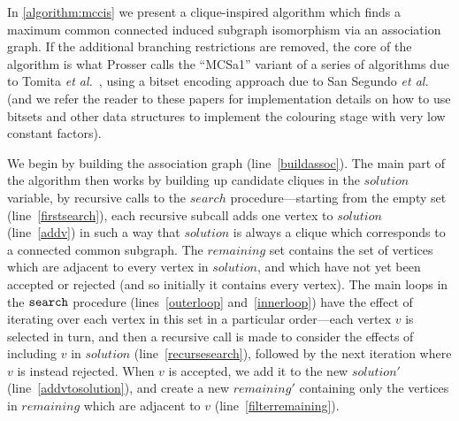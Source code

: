 \documentclass{llncs}
\newcommand{\lineref}[1]{line~\ref{#1}}
\newcommand{\twolinesref}[2]{lines~\ref{#1} and~\ref{#2}}
\begin{document}
In \cref{algorithm:mccis} we present a clique-inspired algorithm which finds a maximum common
connected induced subgraph isomorphism via an
association graph. If the additional
branching restrictions are removed, the core of the algorithm is what Prosser
\cite{DBLP:journals/algorithms/Prosser12} calls the ``MCSa1'' variant of a series of algorithms due
to Tomita \textit{et al.}\
\cite{DBLP:conf/dmtcs/TomitaS03,DBLP:journals/jgo/TomitaK07,DBLP:conf/walcom/TomitaSHTW10}, using a
bitset encoding approach due to San Segundo \textit{et al.}\
\cite{DBLP:journals/cor/SegundoRJ11,DBLP:journals/ol/SegundoMRH13} (and we refer the reader to these
papers for implementation details on how to use bitsets and other data structures to implement the
colouring stage with very low constant factors).

We begin by building the association graph (\lineref{buildassoc}). The main part of the algorithm
then works by building up candidate cliques in the $\mathit{solution}$ variable, by recursive calls
to the $\mathit{search}$ procedure---starting from the empty set (\lineref{firstsearch}), each
recursive subcall adds one vertex to $\mathit{solution}$ (\lineref{addv}) in such a way that
$\mathit{solution}$ is always a clique which corresponds to a connected common subgraph. The
$\mathit{remaining}$ set contains the set of vertices which are adjacent to every vertex in
$\mathit{solution}$, and which have not yet been accepted or rejected (and so initially it contains
every vertex). The main loops in the $\FuncSty{search}$ procedure
(\twolinesref{outerloop}{innerloop}) have the effect of iterating over each vertex in this set in a
particular order---each vertex $v$ is selected in turn, and then a recursive call is made to
consider the effects of including $v$ in $\mathit{solution}$ (\lineref{recursesearch}), followed by
the next iteration where $v$ is instead rejected. When $v$ is accepted, we add it to the new
$\mathit{solution'}$ (\lineref{addvtosolution}), and create a new $\mathit{remaining'}$ containing
only the vertices in $\mathit{remaining}$ which are adjacent to $v$ (\lineref{filterremaining}).
\end{document}
